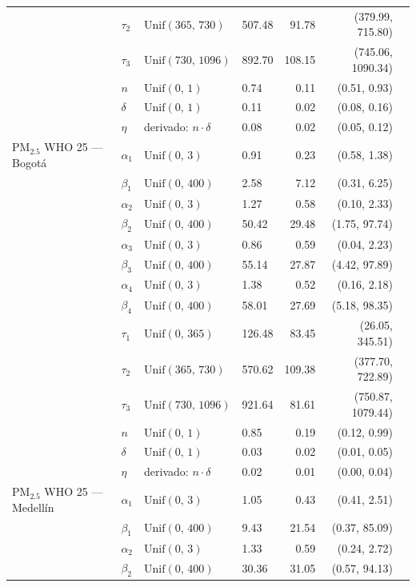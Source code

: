 \begin{longtable}{llllrrr}
 & $\tau_{2}$ & $\text{Unif}(365,\,730)$ & 507.48 & 91.78 & (379.99, 715.80) \\
 & $\tau_{3}$ & $\text{Unif}(730,\,1096)$ & 892.70 & 108.15 & (745.06, 1090.34) \\
 & $n$ & $\text{Unif}(0,\,1)$ & 0.74 & 0.11 & (0.51, 0.93) \\
 & $\delta$ & $\text{Unif}(0,\,1)$ & 0.11 & 0.02 & (0.08, 0.16) \\
 & $\eta$ & derivado: $n \cdot \delta$ & 0.08 & 0.02 & (0.05, 0.12) \\
\midrule
PM$_{2.5}$ WHO 25 --- Bogot\'{a} & $\alpha_{1}$ & $\text{Unif}(0,\,3)$ & 0.91 & 0.23 & (0.58, 1.38) \\
 & $\beta_{1}$ & $\text{Unif}(0,\,400)$ & 2.58 & 7.12 & (0.31, 6.25) \\
 & $\alpha_{2}$ & $\text{Unif}(0,\,3)$ & 1.27 & 0.58 & (0.10, 2.33) \\
 & $\beta_{2}$ & $\text{Unif}(0,\,400)$ & 50.42 & 29.48 & (1.75, 97.74) \\
 & $\alpha_{3}$ & $\text{Unif}(0,\,3)$ & 0.86 & 0.59 & (0.04, 2.23) \\
 & $\beta_{3}$ & $\text{Unif}(0,\,400)$ & 55.14 & 27.87 & (4.42, 97.89) \\
 & $\alpha_{4}$ & $\text{Unif}(0,\,3)$ & 1.38 & 0.52 & (0.16, 2.18) \\
 & $\beta_{4}$ & $\text{Unif}(0,\,400)$ & 58.01 & 27.69 & (5.18, 98.35) \\
 & $\tau_{1}$ & $\text{Unif}(0,\,365)$ & 126.48 & 83.45 & (26.05, 345.51) \\
 & $\tau_{2}$ & $\text{Unif}(365,\,730)$ & 570.62 & 109.38 & (377.70, 722.89) \\
 & $\tau_{3}$ & $\text{Unif}(730,\,1096)$ & 921.64 & 81.61 & (750.87, 1079.44) \\
 & $n$ & $\text{Unif}(0,\,1)$ & 0.85 & 0.19 & (0.12, 0.99) \\
 & $\delta$ & $\text{Unif}(0,\,1)$ & 0.03 & 0.02 & (0.01, 0.05) \\
 & $\eta$ & derivado: $n \cdot \delta$ & 0.02 & 0.01 & (0.00, 0.04) \\
\midrule
PM$_{2.5}$ WHO 25 --- Medell\'{i}n & $\alpha_{1}$ & $\text{Unif}(0,\,3)$ & 1.05 & 0.43 & (0.41, 2.51) \\
 & $\beta_{1}$ & $\text{Unif}(0,\,400)$ & 9.43 & 21.54 & (0.37, 85.09) \\
 & $\alpha_{2}$ & $\text{Unif}(0,\,3)$ & 1.33 & 0.59 & (0.24, 2.72) \\
 & $\beta_{2}$ & $\text{Unif}(0,\,400)$ & 30.36 & 31.05 & (0.57, 94.13) \\

\end{longtable}
